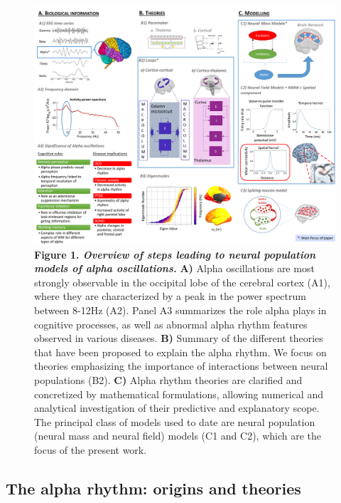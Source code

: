 \documentclass[12pt,twoside]{article}
\begin{document}
\newpage 
\begin{figure}[H]
    \centering
    \includegraphics[scale=0.45]{Images/Fig1__Overview_3.png}
    \caption*{\textbf{Figure 1.  \textit{Overview of steps leading to neural population models of alpha oscillations.}} \textbf{A)} Alpha oscillations are most strongly observable in the occipital lobe of the cerebral cortex (A1), where they are characterized by a peak in the power spectrum between 8-12Hz (A2). Panel A3 summarizes the role alpha plays in cognitive processes, as well as abnormal alpha rhythm features observed in various diseases. \textbf{B)} Summary of the different theories that have been proposed to explain the alpha rhythm. We focus on theories emphasizing the importance of interactions between neural populations (B2). \textbf{C)} Alpha rhythm theories are clarified and concretized by mathematical formulations, allowing numerical and analytical investigation of their predictive and explanatory scope. The principal class of models used to date are neural population (neural mass and neural field) models (C1 and C2), which are the focus of the present work.}
    \label{fig:Overview}
\end{figure}
\subsection{The alpha rhythm: origins and theories}
\end{document}
